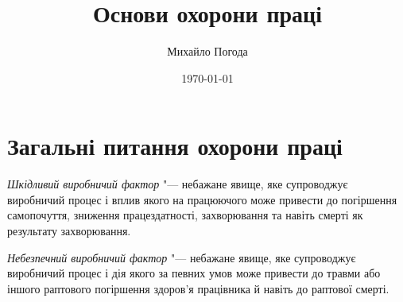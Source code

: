 \documentclass[a4paper,10pt,notitlepage,pdftex,headsepline]{scrartcl}
\author{Михайло Погода}
\title{Основи охорони праці}
\date{\today}
\begin{document}
\begin{titlepage}
  \maketitle
\end{titlepage}

\tableofcontents
\newpage

\section{Загальні питання охорони праці}
  \emph{Шкідливий виробничий фактор} "--- небажане явище, яке супроводжує
  виробничий процес і вплив якого на працюючого може привести до погіршення
  самопочуття, зниження працездатності, захворювання та навіть смерті як
  результату захворювання.

  \emph{Небезпечний виробничий фактор} "--- небажане явище, яке супроводжує
  виробничий процес і дія якого за певних умов може привести до травми або
  іншого раптового погіршення здоров’я працівника й навіть до раптової смерті.
\end{document}
